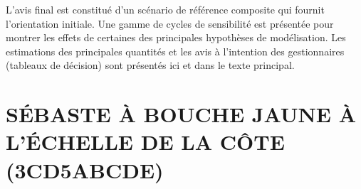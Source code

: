 \documentclass[11pt]{book}
\begin{document}
L'avis final est constitu\'{e} d'un sc\'{e}nario de r\'{e}f\'{e}rence composite qui fournit l'orientation initiale. 
Une gamme de cycles de sensibilit\'{e} est pr\'{e}sent\'{e}e pour montrer les effets de certaines des principales hypoth\`{e}ses  de mod\'{e}lisation. 
Les estimations des principales quantit\'{e}s et les avis \`{a} l'intention des gestionnaires (tableaux de d\'{e}cision) sont pr\'{e}sent\'{e}s ici et dans le texte principal.




\renewcommand*{\arraystretch}{1.1}%

\newcommand{\nSims}{4\,000}
\newcommand{\nChains}{8}
\newcommand{\cSims}{500}
\newcommand{\cBurn}{250}
\newcommand{\cSamps}{250}
\newcommand{\Nmcmc}{2\,000}
\newcommand{\Nbase}{10\,000}

\section{S\'{E}BASTE \`{A} BOUCHE JAUNE \`{A} L'\'{E}CHELLE DE LA C\^{O}TE (3CD5ABCDE)}



\renewcommand{\startYear}{1935} %
\renewcommand{\currYear}{2022}   %
\renewcommand{\prevYear}{2021}   %
\renewcommand{\projYear}{2032}   %
\renewcommand{\pgenYear}{2112}   %
\end{document}

